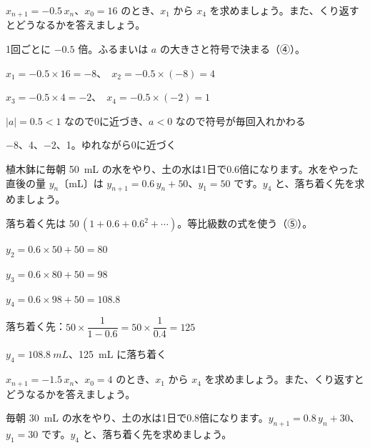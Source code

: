 {}


\begin{reidai}[倍々のくり返し]
$x_{n+1}=-0.5\,x_n$、$x_0=16$ のとき、$x_1$ から $x_4$ を求めましょう。また、くり返すとどうなるかを答えましょう。\par
\kangaekata 1回ごとに $-0.5$ 倍。ふるまいは $a$ の大きさと符号で決まる（④）。\par
\shiki $x_1=-0.5\times16=-8$、\ $x_2=-0.5\times(-8)=4$\par
\kviikq $x_3=-0.5\times4=-2$、\ $x_4=-0.5\times(-2)=1$\par
\kviikq $|a|=0.5<1$ なので0に近づき、$a<0$ なので符号が毎回入れかわる\par
\kotae $-8$、4、$-2$、1。ゆれながら0に近づく
\end{reidai}

\begin{reidai}
植木鉢に毎朝 \qty{50}{mL} の水をやり、土の水は1日で0.6倍になります。水をやった直後の量 $y_n$〔mL〕は $y_{n+1}=0.6\,y_n+50$、$y_1=50$ です。$y_4$ と、落ち着く先を求めましょう。\par
\kangaekata 落ち着く先は $50\,(1+0.6+0.6^2+\cdots)$。等比級数の式を使う（⑤）。\par
\shiki $y_2=0.6\times50+50=80$\par
\kviikq $y_3=0.6\times80+50=98$\par
\kviikq $y_4=0.6\times98+50=108.8$\par
\kviikq 落ち着く先：$50\times\dfrac{1}{1-0.6}=50\times\dfrac{1}{0.4}=125$\par
\kotae $y_4=\qty{108.8}{mL}$、\qty{125}{mL} に落ち着く
\end{reidai}

\begingroup{}%
\noindent\begin{minipage}[t]{0.49\linewidth}
\begin{jibun}
\raggedright $x_{n+1}=-1.5\,x_n$、$x_0=4$ のとき、$x_1$ から $x_4$ を求めましょう。また、くり返すとどうなるかを答えましょう。
\end{jibun}
\end{minipage}\hfill
\begin{minipage}[t]{0.49\linewidth}
\begin{jibun}
\raggedright 毎朝 \qty{30}{mL} の水をやり、土の水は1日で0.8倍になります。$y_{n+1}=0.8\,y_n+30$、$y_1=30$ です。$y_4$ と、落ち着く先を求めましょう。
\end{jibun}
\end{minipage}\par
\endgroup

